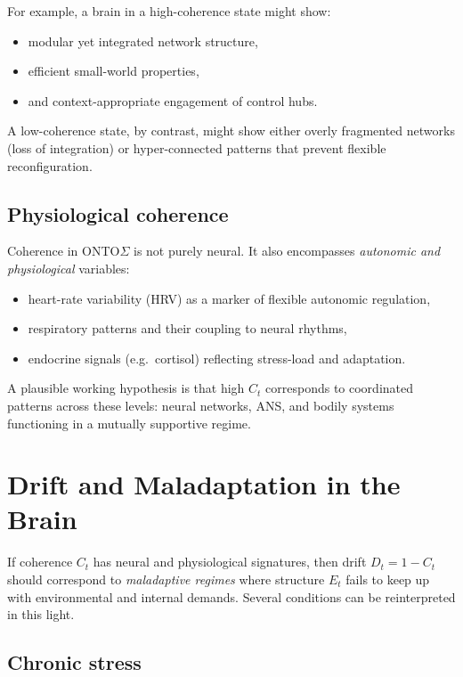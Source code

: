 \documentclass[12pt,a4paper]{report}
\begin{document}
For example, a brain in a high-coherence state might show:

\begin{itemize}[leftmargin=2em]
    \item modular yet integrated network structure,
    \item efficient small-world properties,
    \item and context-appropriate engagement of control hubs.
\end{itemize}

A low-coherence state, by contrast, might show either overly fragmented networks (loss of integration) or hyper-connected patterns that prevent flexible reconfiguration.

\subsection*{Physiological coherence}

Coherence in ONTO$\Sigma$ is not purely neural. It also encompasses \emph{autonomic and physiological} variables:

\begin{itemize}[leftmargin=2em]
    \item heart-rate variability (HRV) as a marker of flexible autonomic regulation,
    \item respiratory patterns and their coupling to neural rhythms,
    \item endocrine signals (e.g.\ cortisol) reflecting stress-load and adaptation.
\end{itemize}

A plausible working hypothesis is that high \(C_t\) corresponds to coordinated patterns across these levels: neural networks, ANS, and bodily systems functioning in a mutually supportive regime.

\section{Drift and Maladaptation in the Brain}

If coherence \(C_t\) has neural and physiological signatures, then drift \(D_t = 1 - C_t\) should correspond to \emph{maladaptive regimes} where structure \(E_t\) fails to keep up with environmental and internal demands. Several conditions can be reinterpreted in this light.

\subsection*{Chronic stress}
\end{document}
